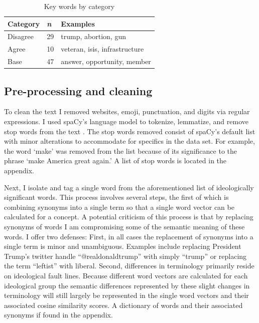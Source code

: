 \documentclass[../embeddings.tex]{subfiles}
\begin{document}
\begin{table}[h]
 \caption{Key words by category}
  \centering
  \begin{tabular}{lll}
    \toprule
    Category      & \textit{n} & Examples\\
    \midrule
    Disagree      &   29       & trump, abortion, gun\\
    Agree         &   10       & veteran, isis, infrastructure\\
    Base          &   47       & answer, opportunity, member\\
    \bottomrule
  \end{tabular}
  \label{tab:table}
\end{table}

\subsection{Pre-processing and cleaning}
To clean the text I removed websites, emoji, punctuation, and digits via regular expressions. I used spaCy’s language model to tokenize, lemmatize, and remove stop words from the text \cite{honnibal-johnson:2015:EMNLP}. The stop words removed consist of spaCy’s default list with minor alterations to accommodate for specifics in the data set. For example, the word ‘make’ was removed from the list because of its significance to the phrase ‘make America great again.’ A list of stop words is located in the appendix.

Next, I isolate and tag a single word from the aforementioned list of ideologically significant words. This process involves several steps, the first of which is combining synonyms into a single term so that a single word vector can be calculated for a concept. A potential criticism of this process is that by replacing synonyms of words I am compromising some of the semantic meaning of these words. I offer two defenses: First, in all cases the replacement of synonyms into a single term is minor and unambiguous. Examples include replacing President Trump’s twitter handle “@realdonaldtrump” with simply “trump” or replacing the term “leftist” with liberal. Second, differences in terminology primarily reside on ideological fault lines. Because different word vectors are calculated for each ideological group the semantic differences represented by these slight changes in terminology will still largely be represented in the single word vectors and their associated cosine similarity scores. A dictionary of words and their associated synonyms if found in the appendix.
\end{document}
